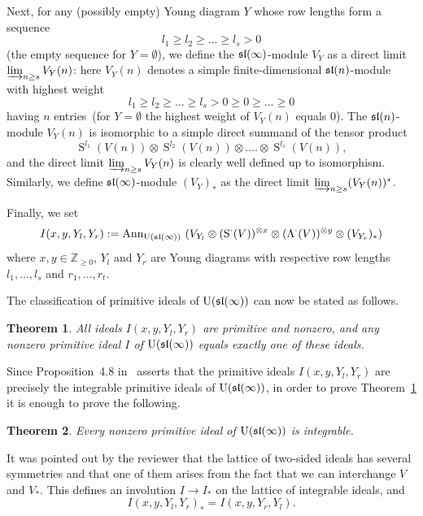 \documentclass[10pt]{amsart}\oddsidemargin -1mm \evensidemargin -1mm \topmargin -15mm\headheight5mm \headsep 3.5mm \textheight 245mm\textwidth 170mm %
\newtheorem{theorem}{Theorem}[section]\newtheorem{lemma}[theorem]{Lemma}\newtheorem{claim}[theorem]{Claim}\newtheorem{remark}[theorem]{Remark}\newtheorem{proposition}[theorem]{Proposition}\newtheorem{corollary}[theorem]{Corollary}\newtheorem{definition}[theorem]{Definition}\newtheorem{Ex}[theorem]{Example}\newtheorem*{Ex0}{Examples}
\begin{document}
Next, for any (possibly empty) Young diagram $Y$ whose row lengths form a sequence  $$l_1\ge l_2\ge...\ge l_s>0$$(the empty sequence for $Y=\emptyset$), we define the $\frak{sl}(\infty)$-module $V_Y$ as a direct limit $\varinjlim_{n\ge s} V_Y(n)$: here $V_Y(n)$ denotes a simple finite-dimensional $\frak{sl}(n)$-module with highest weight $$l_1\ge l_2\ge...\ge l_s>0\ge0\ge...\ge0$$ having $n$ entries~(for $Y=\emptyset$ the highest weight of $V_Y(n)$ equals 0). The $\frak{sl}(n)$-module $V_Y(n)$ is isomorphic to a simple direct summand of the tensor product $$\operatorname{S}^{l_1}(V(n))\otimes\operatorname{S}^{l_2}(V(n))\otimes....\otimes\operatorname{S}^{l_s}(V(n)),$$ and the direct limit $\varinjlim_{n\ge s} V_Y(n)$ is clearly well defined up to isomorphism. Similarly, we define $\frak{sl}(\infty)$-module $(V_Y)_*$ as the direct limit $\varinjlim_{n\ge s}(V_Y(n))^*$.

Finally, we set $$I(x, y, Y_l, Y_r):=\operatorname{\mathrm{Ann}}_{\operatorname{\mathrm{U}}(\frak{sl}(\infty))}~(V_{Y_l}\otimes(\operatorname{\mathrm{S}}^\cdot(V))^{\otimes x}\otimes(\Lambda^\cdot(V))^{\otimes y}\otimes (V_{Y_r})_*)$$ where $x, y\in\mathbb Z_{\ge0}$, $Y_l$ and $Y_r$ are Young diagrams with respective row lengths $l_1,..., l_s$ and $r_1,..., r_t$.


The classification of primitive ideals of $\operatorname{\mathrm{U}}(\frak{sl}(\infty))$ can now be stated as follows.
\begin{theorem}\label{T1} All ideals $I(x, y, Y_l, Y_r)$ are primitive and nonzero, and any nonzero primitive ideal $I$ of $\operatorname{\mathrm{U}}(\frak{sl}(\infty))$ equals exactly one of these ideals.\end{theorem}


Since Proposition~4.8  in~\cite{PP2} asserts that the primitive ideals $I(x, y, Y_l, Y_r)$ are precisely the integrable primitive ideals of $\operatorname{\mathrm{U}}(\frak{sl}(\infty))$, in order to prove Theorem~\ref{T1} it is enough to prove the following.
\begin{theorem}\label{T1b} Every nonzero primitive ideal of $\operatorname{\mathrm{U}}(\frak{sl}(\infty))$ is integrable.\end{theorem}

It was pointed out by the reviewer that the lattice of two-sided ideals has several symmetries and that one of them arises from the fact that we can interchange $V$ and $V_*$. This defines an involution $I\to {I}_*$ on the lattice of integrable ideals, and
$$I(x, y, Y_l, Y_r)_*=I(x, y, Y_r, Y_l).$$
\end{document}

